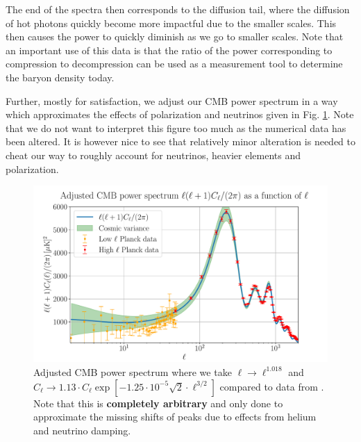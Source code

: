 \documentclass[%
reprint,
 amsmath,amssymb,
 aps,
]{revtex4-2}
\begin{document}
The end of the spectra then corresponds to the diffusion tail, where the diffusion of hot photons quickly become more impactful due to the smaller scales. This then causes the power to quickly diminish as we go to smaller scales. Note that an important use of this data is that the ratio of the power corresponding to compression to decompression can be used as a measurement tool to determine the baryon density today. 

Further, mostly for satisfaction, we adjust our CMB power spectrum in a way which approximates the effects of polarization and neutrinos given in Fig. \ref{fig:C_ell_cheat}. Note that we do not want to interpret this figure too much as the numerical data has been altered. It is however nice to see that relatively minor alteration is needed to cheat our way to roughly account for neutrinos, heavier elements and polarization.
\begin{figure}[ht!]
\includegraphics[width = \linewidth]{Figures/C_ell_cheat.pdf}
\caption{Adjusted CMB power spectrum where we take $\ell\to\ell^{1.018}$ and $C_\ell\to 1.13\cdot C_\ell \exp\left[-1.25\cdot10^{-5}\sqrt{2}\cdot\ell^{3/2}\right]$ compared to data from \cite{Planck:2018vyg}. Note that this is \textbf{completely arbitrary} and only done to approximate the missing shifts of peaks due to effects from helium and neutrino damping.}
\label{fig:C_ell_cheat}
\end{figure}
\end{document}
